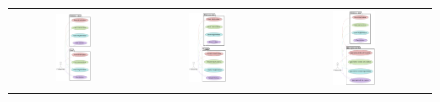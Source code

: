 \begin{figure}[!ht]
    \centering
    \begin{tabular}{ccc} %
        \includegraphics[width=0.30\textwidth, height=0.4\textheight]{figures/Point Diagram.png} & 
        \includegraphics[width=0.30\textwidth, height=0.4\textheight]{figures/Topic Diagram.png} & 
        \includegraphics[width=0.30\textwidth, height=0.4\textheight]{figures/TrueFalseQuestion Diagram.png} \\
        

\end{tabular}
\end{figure}
